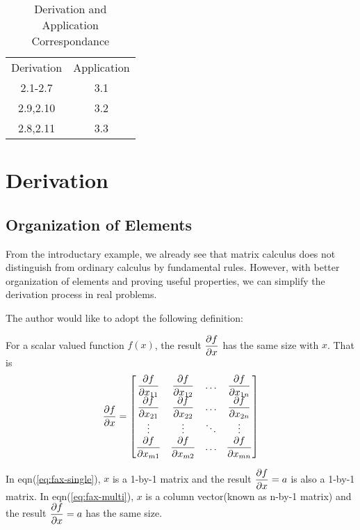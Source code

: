 \begin{table}[htb]
	\label{tbl:relation}
	\centering
	\caption{Derivation and Application Correspondance}
	\begin{tabular}{c|c}
		\hline
		Derivation & Application \\
		2.1-2.7 & 3.1 \\
		2.9,2.10 & 3.2 \\
		2.8,2.11 & 3.3 \\
		\hline
	\end{tabular}
\end{table}


\section{Derivation}
\label{sec:derivation}

\subsection{Organization of Elements}
From the introductary example, we already see that matrix calculus 
does not distinguish from ordinary calculus by fundamental rules. 
However, with better organization of elements and 
proving useful properties, we can simplify the derivation process 
in real problems. 

The author would like to adopt the following definition:
\begin{mydef}
	\label{def:org}
	For a scalar valued function $f(x)$, the result $\dfrac{\partial f}{\partial x}$
	has the same size with $x$. That is 
	\begin{equation}
		\dfrac{\partial f}{\partial x} = 
		\left[
		\begin{matrix}
			\dfrac{\partial f}{\partial x_{11}} & \dfrac{\partial f}{\partial x_{12}} & \ldots &\dfrac{\partial f}{\partial x_{1n}}\\
			\dfrac{\partial f}{\partial x_{21}} & \dfrac{\partial f}{\partial x_{22}} & \ldots &\dfrac{\partial f}{\partial x_{2n}}\\
			\vdots & \vdots & \ddots & \vdots \\
			\dfrac{\partial f}{\partial x_{m1}} & \dfrac{\partial f}{\partial x_{m2}} & \ldots &\dfrac{\partial f}{\partial x_{mn}}\\
		\end{matrix}
		\right]
	\end{equation}
\end{mydef}

In eqn(\ref{eq:fax-single}), $x$ is a 1-by-1 matrix and the result
$\dfrac{\partial f}{\partial x}=a$ is also a 1-by-1 matrix. In eqn(\ref{eq:fax-multi}), 
$x$ is a column vector(known as n-by-1 matrix) and the result
$\dfrac{\partial f}{\partial x}=a$ has the same size. 

